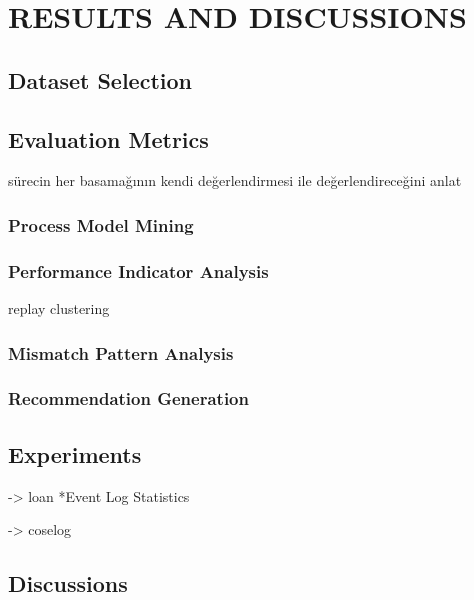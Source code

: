 \chapter{RESULTS AND DISCUSSIONS}
\label{chp:results-and-discussions}
 

\section{Dataset Selection}
\label{sec:dataset-selection}
 

\section{Evaluation Metrics}
\label{sec:evaluation-metrics}
sürecin her basamağının kendi değerlendirmesi ile değerlendireceğini anlat


\subsection{Process Model Mining}
\label{subsec:process-model-mining-eval}

\subsection{Performance Indicator Analysis}
\label{subsec:performance-indicator-analysis-eval}
		replay 
		clustering

\subsection{Mismatch Pattern Analysis}
\label{subsec:mismatch-pattern-analysis-eval}


\subsection{Recommendation Generation}
\label{subsec:recommendation-generation-eval}

\section{Experiments}
\label{sec:experiments}

-> loan
*Event Log Statistics

-> coselog

\section{Discussions}
\label{sec:discussions}